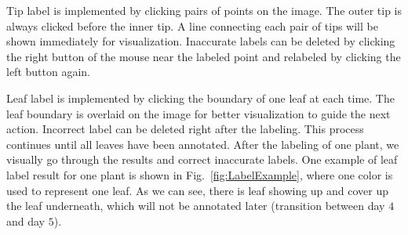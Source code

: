 Tip label is implemented by clicking pairs of points on the image.
The outer tip is always clicked before the inner tip.
A line connecting each pair of tips will be shown immediately for visualization.
Inaccurate labels can be deleted by clicking the right button of the mouse near the labeled point and relabeled by clicking the left button again.

Leaf label is implemented by clicking the boundary of one leaf at each time.
The leaf boundary is overlaid on the image for better visualization to guide the next action.
Incorrect label can be deleted right after the labeling. 
This process continues until all leaves have been annotated.
After the labeling of one plant, we visually go through the results and correct inaccurate labels. 
One example of leaf label result for one plant is shown in Fig.~\ref{fig:LabelExample}, where one color is used to represent one leaf.  
As we can see, there is leaf showing up and cover up the leaf underneath, which will not be annotated later (transition between day $4$ and day $5$). 



